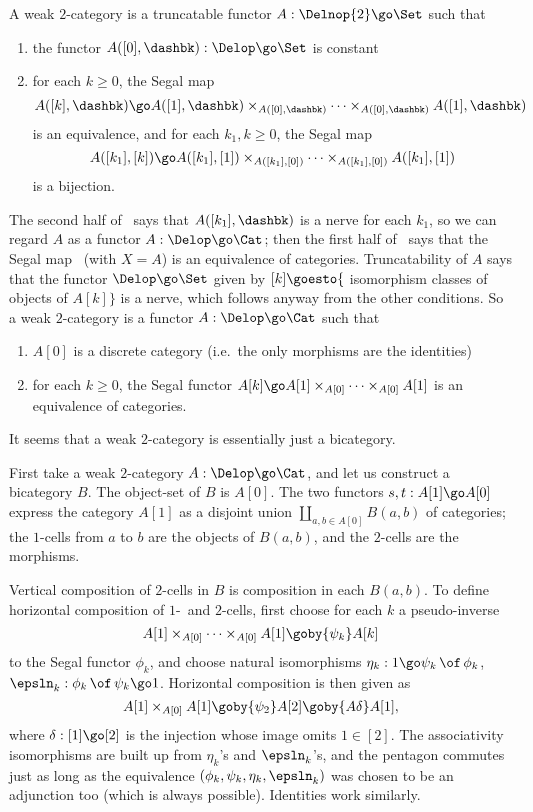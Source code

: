 A weak $2$-category is a truncatable functor $A: \Delnop{2} \go \Set$ such
that
%
\begin{enumerate}
\item the functor $A([0],\dashbk): \Delop \go \Set$ is constant
\item for each $k\geq 0$, the Segal map 
\[
A([k], \dashbk) \go 
A([1],\dashbk) \times_{A([0],\dashbk)} \cdots 
\times_{A([0],\dashbk)} A([1],\dashbk)
\]
is an equivalence, and for each $k_1, k\geq 0$, the Segal map
\[
A([k_1],[k]) \go 
A([k_1],[1]) \times_{A([k_1],[0])} \cdots 
\times_{A([k_1],[0])} A([k_1],[1])
\]
is a bijection.
\end{enumerate}
% 
The second half of~ says that $A([k_1],\dashbk)$ is a
nerve for each $k_1$, so we can regard $A$ as a functor $A: \Delop \go \Cat$;
then the first half of~ says that the Segal
map~ (with $X=A$)
is an equivalence of categories.  Truncatability of $A$ says that the functor
$\Delop \go \Set$ given by
$
[k] \goesto \{
$%
isomorphism classes of objects of
$
A[k] \}
$
is a nerve, which follows anyway from the other conditions.  So a weak
$2$-category is a functor $A: \Delop \go \Cat$ such that
%
\begin{enumerate}
\item $A[0]$ is a discrete category (i.e.\ the only morphisms are the
identities) 
\item for each $k\geq 0$, the Segal functor 
$
A[k] \go A[1] \times_{A[0]} \cdots \times_{A[0]} A[1]
$
is an equivalence of categories. 
\end{enumerate}

It seems that a weak $2$-category is essentially just a bicategory.

First take a weak $2$-category $A: \Delop \go \Cat$, and let us construct a
bicategory $B$.  The object-set of $B$ is $A[0]$.  The two functors
$s,t: A[1] \go A[0]$ express the category $A[1]$ as a disjoint union
$\coprod_{a,b\in A[0]}B(a,b)$ of categories; the $1$-cells from $a$ to $b$
are the objects of $B(a,b)$, and the $2$-cells are the morphisms.

Vertical composition of $2$-cells in $B$ is composition in each
$B(a,b)$.  To define horizontal composition of $1$-~and $2$-cells,
first choose for each $k$ a pseudo-inverse
\[
A[1] \times_{A[0]} \cdots \times_{A[0]} A[1] \goby{\psi_k} A[k]
\]
to the Segal functor $\phi_k$, and choose natural isomorphisms $\eta_k: 1 \go
\psi_k\,\of\,\phi_k$, $\epsln_k: \phi_k\,\of\,\psi_k \go 1$.  Horizontal
composition is then given as
\[
A[1] \times_{A[0]} A[1] \goby{\psi_2} A[2] \goby{A\delta} A[1],
\]
where $\delta:[1] \go [2]$ is the injection whose image omits $1\in [2]$.
The associativity isomorphisms are built up from $\eta_k$'s and $\epsln_k$'s,
and the pentagon commutes just as long as the equivalence
$(\phi_k,\psi_k,\eta_k,\epsln_k)$ was chosen to be an adjunction too (which
is always possible).  Identities work similarly.


